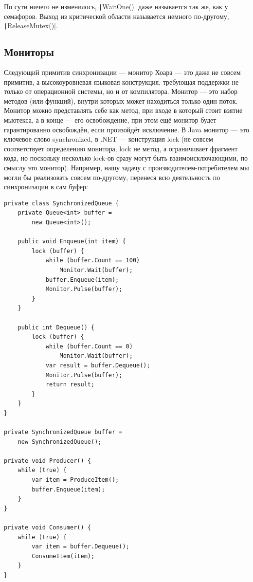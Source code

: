 \documentclass[a5paper]{article}
\begin{document}
По сути ничего не изменилось, \texttt|WaitOne()| даже называется так же, как у семафоров. Выход из критической области называется немного по-другому, \texttt|ReleaseMutex()|.

\subsection{Мониторы}

Следующий примитив синхронизации --- монитор Хоара --- это даже не совсем примитив, а высокоуровневая языковая конструкция, требующая поддержки не только от операционной системы, но и от компилятора. Монитор --- это набор методов (или функций), внутри которых может находиться только один поток. Монитор можно представлять себе как метод, при входе в который стоит взятие мьютекса, а в конце --- его освобождение, при этом ещё монитор будет гарантированно освобождён, если произойдёт исключение. В Java монитор --- это ключевое слово synchronized, в .NET --- конструкция lock (не совсем соответствует определению монитора, lock не метод, а ограничивает фрагмент кода, но поскольку несколько lock-ов сразу могут быть взаимоисключающими, по смыслу это монитор). Например, нашу задачу с производителем-потребителем мы могли бы реализовать совсем по-другому, перенеся всю деятельность по синхронизации в сам буфер:

\begin{verbatim}
private class SynchronizedQueue {
    private Queue<int> buffer = 
        new Queue<int>();

    public void Enqueue(int item) {
        lock (buffer) {
            while (buffer.Count == 100)
                Monitor.Wait(buffer);
            buffer.Enqueue(item);
            Monitor.Pulse(buffer);
        }
    }

    public int Dequeue() {
        lock (buffer) {
            while (buffer.Count == 0)
                Monitor.Wait(buffer);
            var result = buffer.Dequeue();
            Monitor.Pulse(buffer);
            return result;
        }
    }
}

private SynchronizedQueue buffer = 
    new SynchronizedQueue();

private void Producer() {
    while (true) {
        var item = ProduceItem();
        buffer.Enqueue(item);
    }
}

private void Consumer() {
    while (true) {
        var item = buffer.Dequeue();
        ConsumeItem(item);
    }
}
\end{verbatim}
\end{document}
